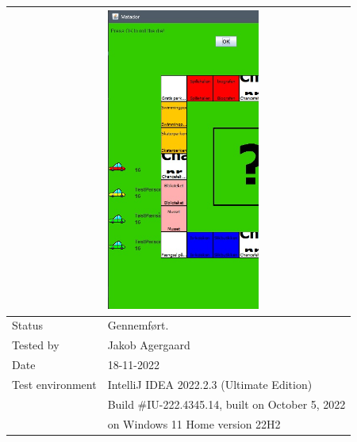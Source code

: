 \documentclass{article}
\begin{document}
\begin{tabular}{ | m{} | m{}|}
     & \includegraphics[height = 10cm]{Billeder/TC01.jpg}\\
    \hline
    Status & Gennemført.\\
    \hline
    Tested by & Jakob Agergaard\\
    \hline
    Date & 18-11-2022\\
    \hline
    Test environment & IntelliJ IDEA 2022.2.3 (Ultimate Edition)\\
      & Build \#IU-222.4345.14, built on October 5, 2022\\
      & on Windows 11 Home version 22H2\\
    \hline
\end{tabular}
\end{document}
